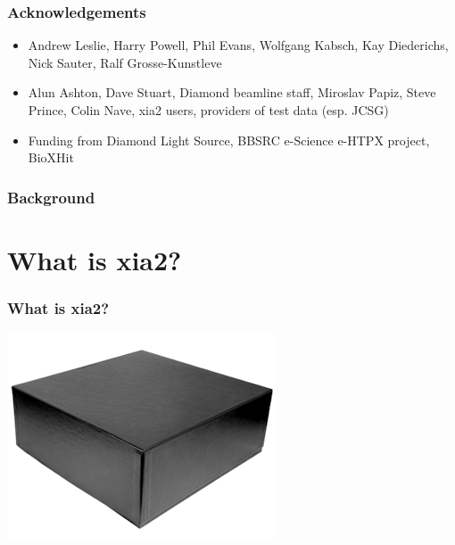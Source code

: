 \documentclass[slides,compress]{beamer}
\begin{document}
\begin{frame}
\frametitle{Acknowledgements}
\begin{itemize}
\item{Andrew Leslie, Harry Powell, Phil Evans, Wolfgang Kabsch, Kay Diederichs,
Nick Sauter, Ralf Grosse-Kunstleve}
\item{Alun Ashton, Dave Stuart, Diamond beamline staff, Miroslav Papiz, 
Steve Prince, Colin Nave, xia2 users, providers of test data (esp. JCSG)}
\item{Funding from Diamond Light Source, BBSRC e-Science e-HTPX project, 
BioXHit}
\end{itemize}
\end{frame}

\begin{frame}
\frametitle{Background}
\begin{itemize}
\end{itemize}
\end{frame}

\section{What is xia2?}

\begin{frame}
\frametitle{What is xia2?}
\includegraphics[scale=1]{figures/blackbox.png}
\end{frame}
\end{document}
